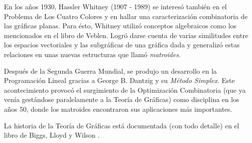 En los años 1930, Hassler Whitney (1907 - 1989) se interesó también en el Problema de Los Cuatro Colores y en hallar una caracterización combinatoria de las gráficas planas. Para ésto, Whitney utilizó conceptos algebraicos como los mencionados en el libro de Veblen. Logró darse cuenta de varias similitudes entre los espacios vectoriales y las subgráficas de una gráfica dada y generalizó estas relaciones en unas nuevas estructuras que llamó \textit{matroides}.

Después de la Segunda Guerra Mundial, se produjo un desarrollo en la Programación Lineal gracias a George B. Dantzig y su \textit{Método Simplex}. Este acontecimiento provocó el surgimiento de la Optimización Combinatoria (que ya venía gestándose paralelamente a la Teoría de Gráficas) como disciplina en los años 50, donde los matroides encontraron sus aplicaciones más importantes.

La historia de la Teoría de Gráficas está documentada (con todo detalle) en el libro de Biggs, Lloyd y Wilson \cite{Biggs}.  


